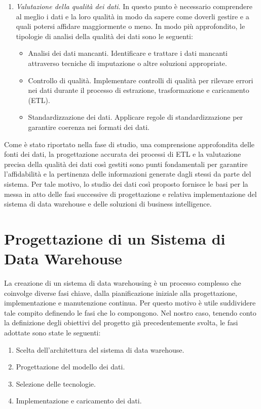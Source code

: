 \begin{enumerate}
\begin{itemize}
    \end{itemize}
    \item \textit{Valutazione della qualità dei dati}. In questo punto è necessario comprendere al meglio i dati e la loro qualità in modo da sapere come doverli gestire e a quali potersi affidare maggiormente o meno. In modo più approfondito, le tipologie di analisi della qualità dei dati sono le seguenti:
    \begin{itemize}
        \item Analisi dei dati mancanti. Identificare e trattare i dati mancanti attraverso tecniche di imputazione o altre soluzioni appropriate.
        \item Controllo di qualità. Implementare controlli di qualità per rilevare errori nei dati durante il processo di estrazione, trasformazione e caricamento (ETL).
        \item Standardizzazione dei dati. Applicare regole di standardizzazione per garantire coerenza nei formati dei dati.
    \end{itemize}
\end{enumerate}

Come è stato riportato nella fase di studio, una comprensione approfondita delle fonti dei dati, la progettazione accurata dei processi di ETL e la valutazione precisa della qualità dei dati così gestiti sono punti fondamentali per garantire l'affidabilità e la pertinenza delle informazioni generate dagli stessi da parte del sistema. Per tale motivo, lo studio dei dati così proposto fornisce le basi per la messa in atto delle fasi successive di progettazione e relativa implementazione del sistema di data warehouse e delle soluzioni di business intelligence.

\section{Progettazione di un Sistema di Data Warehouse}

La creazione di un sistema di data warehousing è un processo complesso che coinvolge diverse fasi chiave, dalla pianificazione iniziale alla progettazione, implementazione e manutenzione continua. Per questo motivo è utile suddividere tale compito definendo le fasi che lo compongono. Nel nostro caso, tenendo conto la definizione degli obiettivi del progetto già precedentemente svolta, le fasi adottate sono state le seguenti:
\begin{enumerate}
    \item Scelta dell'architettura del sistema di data warehouse.
    \item Progettazione del modello dei dati.
    \item Selezione delle tecnologie.
    \item Implementazione e caricamento dei dati.
\end{enumerate}

